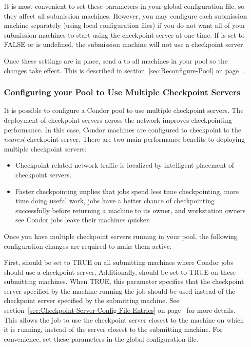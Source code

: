 It is most convenient to set these parameters in your global configuration file,
so they affect all submission machines.
However, you may configure each submission machine separately (using
local configuration files) if you do not want all of your submission machines
to start using the checkpoint server at one time.
If  is set to FALSE or is undefined, the
submission machine will not use a checkpoint server.

Once these settings are in place, send a
 to all machines in your pool so the changes take
effect.
This is described in section~\ref{sec:Reconfigure-Pool} on
page~\pageref{sec:Reconfigure-Pool}.

\subsubsection{\label{sec:Configure-Multiple-Ckpt-Server} 
Configuring your Pool to Use Multiple Checkpoint Servers}


It is possible to configure a Condor pool to use multiple checkpoint
servers.
The deployment of
checkpoint servers across the
network improves checkpointing performance.
In this case, Condor machines are configured to checkpoint to the
\emph{nearest} checkpoint server.
There are two main performance benefits to deploying multiple checkpoint
servers:
\begin{itemize}
\item Checkpoint-related network traffic is localized by
intelligent placement of checkpoint servers.
\item Faster checkpointing implies that jobs spend less time
checkpointing, more time doing useful work, jobs have a better
chance of checkpointing successfully before returning a
machine to its owner, and workstation
owners see Condor jobs leave their machines quicker.
\end{itemize}

Once you have multiple checkpoint servers running in your pool, the
following configuration changes are required to make them active.

First,  should be set to TRUE on all
submitting machines where Condor jobs should use a checkpoint server.
Additionally,  should be set to
TRUE on these submitting machines.
When TRUE, this parameter specifies that the checkpoint server
specified by the machine running the job should be used instead of the
checkpoint server specified by the submitting machine.
See section~\ref{sec:Checkpoint-Server-Config-File-Entries} on
page~\pageref{sec:Checkpoint-Server-Config-File-Entries} for more
details.
This allows the job to use the checkpoint server closest to the
machine on which it is running, instead of the server closest to the
submitting machine.
For convenience, set these parameters in the
global configuration file.

